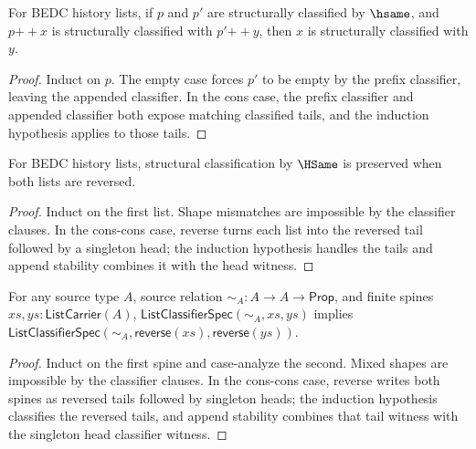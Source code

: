 \begin{theorem}
\label{thm:list-classifier-hsame-append-left-cancel-classified}
For BEDC history lists, if \(p\) and \(p'\) are structurally classified by
\(\hsame\), and \(p{++}x\) is structurally classified with \(p'{++}y\), then
\(x\) is structurally classified with \(y\).
\end{theorem}
\begin{proof}
Induct on \(p\). The empty case forces \(p'\) to be empty by the prefix
classifier, leaving the appended classifier. In the cons case, the prefix
classifier and appended classifier both expose matching classified tails, and
the induction hypothesis applies to those tails.
\end{proof}

\begin{theorem}
\label{thm:list-classifier-reverse-hsame}
For BEDC history lists, structural classification by $\HSame$ is preserved when both lists are reversed.
\end{theorem}
\begin{proof}
Induct on the first list. Shape mismatches are impossible by the classifier clauses. In the cons-cons case, reverse turns each list into the reversed tail followed by a singleton head; the induction hypothesis handles the tails and append stability combines it with the head witness.
\end{proof}

\begin{theorem}
\label{thm:list-classifier-reverse-source-relation}
For any source type $A$, source relation $\sim_A:A\to A\to\mathsf{Prop}$, and finite spines $xs,ys:\mathsf{ListCarrier}(A)$, $\mathsf{ListClassifierSpec}(\sim_A,xs,ys)$ implies $\mathsf{ListClassifierSpec}(\sim_A,\mathsf{reverse}(xs),\mathsf{reverse}(ys))$.
\end{theorem}
\begin{proof}
Induct on the first spine and case-analyze the second. Mixed shapes are impossible by the classifier clauses. In the cons-cons case, reverse writes both spines as reversed tails followed by singleton heads; the induction hypothesis classifies the reversed tails, and append stability combines that tail witness with the singleton head classifier witness.
\end{proof}

